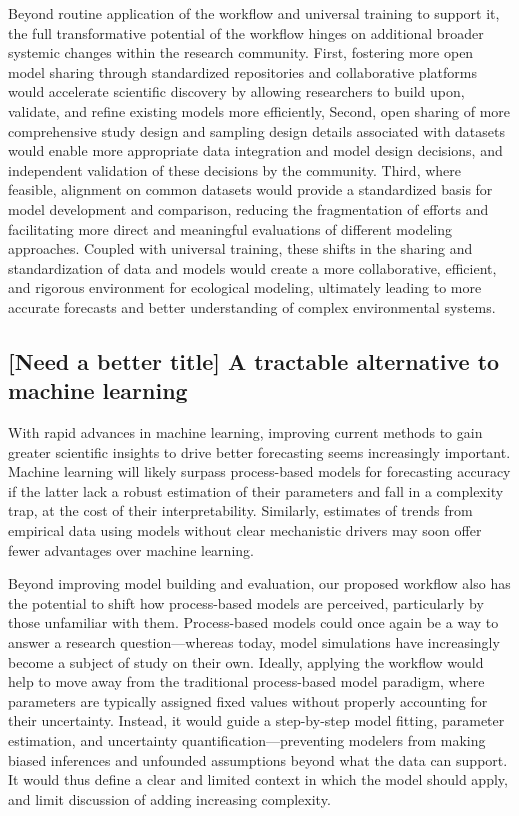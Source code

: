 \documentclass[11pt]{article}
\newcommand{\llabel}[1]{\hypertarget{lintarget:#1}{}\linelabel{lin:#1}}
\begin{document}
\llabel{studydesignandmore}Beyond routine application of the workflow and universal training to support it, the full transformative potential of the workflow hinges on additional broader systemic changes within the research community. First, fostering more open model sharing through standardized repositories and collaborative platforms would accelerate scientific discovery by allowing researchers to build upon, validate, and refine existing models more efficiently, Second, open sharing of more comprehensive study design and sampling design details associated with datasets would enable more appropriate data integration and model design decisions, and independent validation of these decisions by the community. Third, where feasible, alignment on common datasets would provide a standardized basis for model development and comparison, reducing the fragmentation of efforts and facilitating more direct and meaningful evaluations of different modeling approaches. Coupled with universal training, these shifts in the sharing and standardization of data and models would create a more collaborative, efficient, and rigorous environment for ecological modeling, ultimately leading to more accurate forecasts and better understanding of complex environmental systems.

\subsection{[Need a better title] A tractable alternative to machine learning}

With rapid advances in machine learning, improving current methods to gain greater scientific insights to drive better forecasting seems increasingly important. \llabel{MLvsPBM}Machine learning will likely surpass process-based models for forecasting accuracy if the latter lack a robust estimation of their parameters and fall in a complexity trap, at the cost of their interpretability. Similarly, estimates of trends from empirical data using models without clear mechanistic drivers may soon offer fewer advantages over machine learning. 

Beyond improving model building and evaluation, our proposed workflow also has the potential to shift how process-based models are perceived, particularly by those unfamiliar with them.
Process-based models could once again be a way to answer a research question---whereas today, model simulations have increasingly become a subject of study on their own.
Ideally, applying the workflow would help to move away from the traditional process-based model paradigm, where parameters are typically assigned fixed values without properly accounting for their uncertainty. Instead, it would guide a step-by-step model fitting, parameter estimation, and uncertainty quantification---preventing modelers from making biased inferences and unfounded assumptions beyond what the data can support. It would thus define a clear and limited context in which the model should apply, and limit discussion of adding increasing complexity. 
\end{document}
